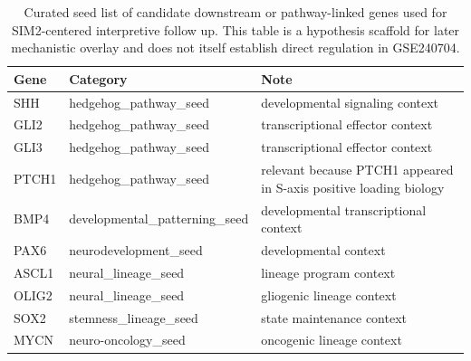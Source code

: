 \begin{table}[htbp]
\centering
\caption{Curated seed list of candidate downstream or pathway-linked genes used for SIM2-centered interpretive follow up. This table is a hypothesis scaffold for later mechanistic overlay and does not itself establish direct regulation in GSE240704.}
\label{tab:sim2_downstream_target_seed}
\begin{tabular}{lll}
\hline
Gene & Category & Note \\
\hline
SHH & hedgehog\_pathway\_seed & developmental signaling context \\
GLI2 & hedgehog\_pathway\_seed & transcriptional effector context \\
GLI3 & hedgehog\_pathway\_seed & transcriptional effector context \\
PTCH1 & hedgehog\_pathway\_seed & relevant because PTCH1 appeared in S-axis positive loading biology \\
BMP4 & developmental\_patterning\_seed & developmental transcriptional context \\
PAX6 & neurodevelopment\_seed & developmental context \\
ASCL1 & neural\_lineage\_seed & lineage program context \\
OLIG2 & neural\_lineage\_seed & gliogenic lineage context \\
SOX2 & stemness\_lineage\_seed & state maintenance context \\
MYCN & neuro-oncology\_seed & oncogenic lineage context \\
\hline
\end{tabular}
\end{table}
